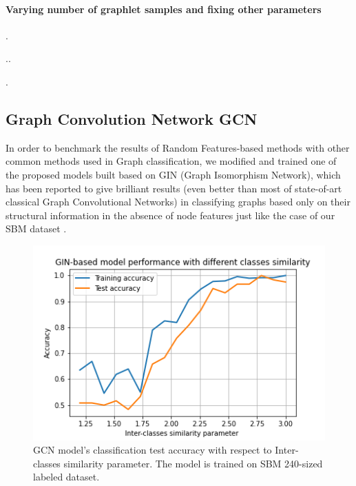 \paragraph{Varying number of graphlet samples and fixing other parameters }
.

..

.
\subsection{Graph Convolution Network GCN}
In order to benchmark the results of Random Features-based methods with other common methods used in Graph classification, we modified and trained one of the proposed models built based on GIN (Graph Isomorphism Network), which has been reported to give brilliant results (even better than most of state-of-art classical Graph Convolutional Networks) in classifying graphs based only on their structural information in the absence of node features just like the case of our SBM dataset \citep{GCN_powerful}. 

\begin{figure}[H]
\centering
\includegraphics[scale=0.7]{LatexDiss/Dissertation/figs/GNN_GIN.png}

\caption[GCN model's classification test accuracy as a function of Inter-classes similarity parameter ]{GCN model's classification test accuracy with respect to Inter-classes similarity parameter. The  model is trained on SBM 240-sized labeled dataset.}
\label{fig:GCN_GIN_SBM_multfactor_RW}
\end{figure}

